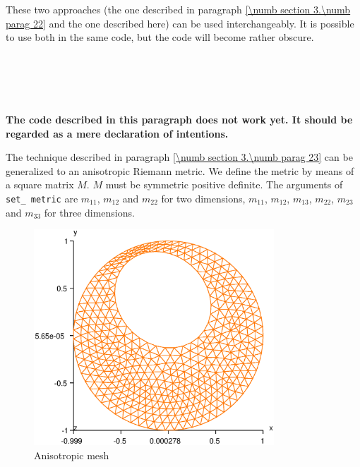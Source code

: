 These two approaches (the one described in paragraph \ref{\numb section 3.\numb parag 22} and
the one described here) can be used interchangeably.
It is possible to use both in the same code, but the code will become rather obscure.


\section{~~}\label{\numb section 3.\numb parag 24}

{\normalfont\bfseries The code described in this paragraph does not work yet.
It should be regarded as a mere declaration of intentions.}
\medskip

The technique described in paragraph \ref{\numb section 3.\numb parag 23} can be generalized to
an anisotropic Riemann metric.
We define the metric by means of a square matrix $M$.
$M$ must be symmetric positive definite.
The arguments of {\small\tt set\_\,metric} are $ m_{11} $, $ m_{12} $ and $ m_{22} $
for two dimensions,
$ m_{11} $, $ m_{12} $, $ m_{13} $, $ m_{22} $, $ m_{23} $ and $ m_{33} $ for three dimensions.

\begin{figure}[ht] \centering
 \includegraphics[width=90mm]{disk-anisotrop}
  \caption{Anisotropic mesh}
  \label{\numb section 3.\numb fig 12}
\end{figure}

